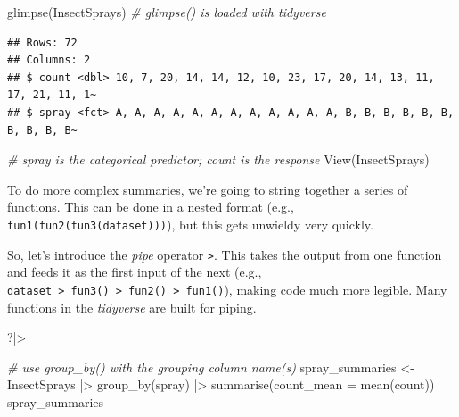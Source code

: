 \documentclass[
  11pt,
  a4paper,
]{book}
\newenvironment{Shaded}{\begin{snugshade}}{\end{snugshade}}
\newcommand{\AttributeTok}[1]{\textcolor[rgb]{0.77,0.63,0.00}{#1}}
\newcommand{\CommentTok}[1]{\textcolor[rgb]{0.56,0.35,0.01}{\textit{#1}}}
\newcommand{\FunctionTok}[1]{\textcolor[rgb]{0.00,0.00,0.00}{#1}}
\newcommand{\NormalTok}[1]{#1}
\newcommand{\OtherTok}[1]{\textcolor[rgb]{0.56,0.35,0.01}{#1}}
\newcommand{\SpecialCharTok}[1]{\textcolor[rgb]{0.00,0.00,0.00}{#1}}
\newcommand{\StringTok}[1]{\textcolor[rgb]{0.31,0.60,0.02}{#1}}
\begin{document}
\begin{Shaded}
\begin{Highlighting}[]
\FunctionTok{glimpse}\NormalTok{(InsectSprays) }\CommentTok{\# glimpse() is loaded with tidyverse}
\end{Highlighting}
\end{Shaded}

\begin{verbatim}
## Rows: 72
## Columns: 2
## $ count <dbl> 10, 7, 20, 14, 14, 12, 10, 23, 17, 20, 14, 13, 11, 17, 21, 11, 1~
## $ spray <fct> A, A, A, A, A, A, A, A, A, A, A, A, B, B, B, B, B, B, B, B, B, B~
\end{verbatim}

\begin{Shaded}
\begin{Highlighting}[]
\CommentTok{\# spray is the categorical predictor; count is the response}
\FunctionTok{View}\NormalTok{(InsectSprays)}
\end{Highlighting}
\end{Shaded}

To do more complex summaries, we're going to string together a series of functions. This can be done in a nested format (e.g., \texttt{fun1(fun2(fun3(dataset)))}), but this gets unwieldy very quickly.

So, let's introduce the \emph{pipe} operator \texttt{\textbar{}\textgreater{}}. This takes the output from one function and feeds it as the first input of the next (e.g., \texttt{dataset\ \textbar{}\textgreater{}\ fun3()\ \textbar{}\textgreater{}\ fun2()\ \textbar{}\textgreater{}\ fun1()}), making code much more legible. Many functions in the \emph{tidyverse} are built for piping.

\begin{Shaded}
\begin{Highlighting}[]
\NormalTok{?}\StringTok{\textasciigrave{}}\AttributeTok{|\textgreater{}}\StringTok{\textasciigrave{}}
\end{Highlighting}
\end{Shaded}

\begin{Shaded}
\begin{Highlighting}[]
\CommentTok{\# use group\_by() with the grouping column name(s)}
\NormalTok{spray\_summaries }\OtherTok{\textless{}{-}}\NormalTok{ InsectSprays }\SpecialCharTok{|\textgreater{}}
  \FunctionTok{group\_by}\NormalTok{(spray) }\SpecialCharTok{|\textgreater{}}
  \FunctionTok{summarise}\NormalTok{(}\AttributeTok{count\_mean =} \FunctionTok{mean}\NormalTok{(count))}
\NormalTok{spray\_summaries}
\end{Highlighting}
\end{Shaded}
\end{document}
